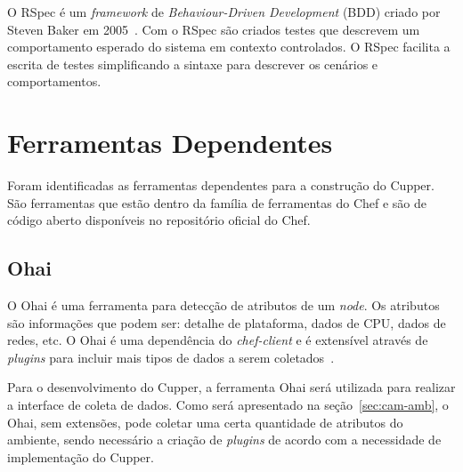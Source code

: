 O RSpec é um \textit{framework} de \textit{Behaviour-Driven Development} (BDD)
criado por Steven Baker em 2005~\cite{chelimsky:2010}. Com o RSpec
são criados testes que descrevem um comportamento esperado do sistema
em contexto controlados. O RSpec facilita a escrita de testes simplificando
a sintaxe para descrever os cenários e comportamentos.

\section{Ferramentas Dependentes}
\label{sec:deps}

Foram identificadas as ferramentas dependentes para a construção do Cupper.
São ferramentas que estão dentro da família de ferramentas do Chef e são
de código aberto disponíveis no repositório oficial do Chef.

\subsection{Ohai}
\label{sec:deps:ohai}

O Ohai é uma ferramenta para detecção de atributos de um \textit{node}. Os atributos são
informações que podem ser: detalhe de plataforma, dados de CPU, dados de redes, etc.
O Ohai é uma dependência do \textit{chef-client} e é extensível através de \textit{plugins}
para incluir mais tipos de dados a serem coletados~\cite{ohaidoc:2016}.

Para o desenvolvimento do Cupper, a ferramenta Ohai será utilizada para realizar a
interface de coleta de dados. Como será apresentado na seção~\ref{sec:cam-amb}, o
Ohai, sem extensões, pode coletar uma certa quantidade de atributos do ambiente, sendo
necessário a criação de \textit{plugins} de acordo com a necessidade de implementação do Cupper.


